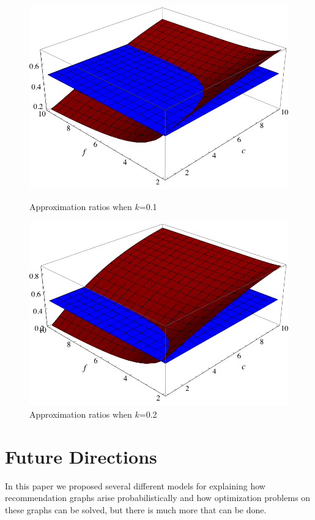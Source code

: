 \documentclass[]{article}
\begin{document}
\begin{figure}[h]
\begin{minipage}[h]{0.45\linewidth}
\centering
\includegraphics[width=\textwidth]{k=0_1.png}
\caption{Approximation ratios when $k$=0.1}
\end{minipage}
\hspace{0.5cm}
\begin{minipage}[h]{0.45\linewidth}
\centering
\includegraphics[width=\textwidth]{k=0_2.png}
\caption{Approximation ratios when $k$=0.2}
\end{minipage}
\end{figure}

\section{Future Directions}
In this paper we proposed several different models for explaining how
recommendation graphs arise probabilistically and how optimization 
problems on these graphs can be solved, but there is much more that
can be done.
\end{document}

